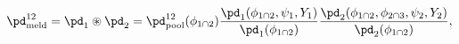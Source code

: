 \begin{equation}
  \pd_{\text{meld}}^{12} = \pd_{1} \circledast \pd_{2} =  
    \pd_{\text{pool}}^{12}(\phi_{1 \cap 2})
    \frac{
      \pd_{1}(\phi_{1 \cap 2}, \psi_{1}, Y_{1})
    } {
      \pd_{1}(\phi_{1 \cap 2})
    }
    \frac{
      \pd_{2}(\phi_{1 \cap 2}, \phi_{2 \cap 3}, \psi_{2}, Y_{2})
    } {
      \pd_{2}(\phi_{1 \cap 2})
    },
  \label{eqn:def-usual-melded-model}
\end{equation}